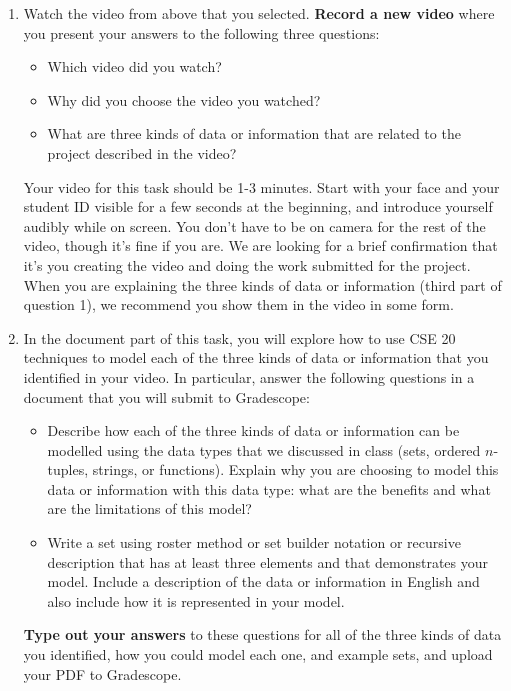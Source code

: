 \documentclass[12pt, oneside]{article}
\begin{document}
\begin{enumerate}
\item Watch the video from above that you selected. {\bf Record a new video} where you present 
your answers to the following three questions:
\begin{itemize}
    \item Which video did you watch?
    \item Why did you choose the video you watched?
    \item What are three kinds of data or information that are related to the project described in the video?
\end{itemize}
Your video for this task should be 1-3 minutes. Start with 
your face and your student ID visible for a few seconds at the beginning, and introduce yourself audibly while on screen. 
You don't have to be on camera for the rest of the video, though it's fine if you are. 
We are looking for a brief confirmation that it's you creating the video and doing the work 
submitted for the project. When you are explaining the three kinds of data or information (third part of question 1), 
we recommend you show them in the video in some form.

\item In the document part of this task, you will explore how to use CSE 20 techniques to 
model each of the three kinds of data or 
information that you identified in 
your video. In particular, answer the following questions in a document 
that you will submit to Gradescope:
\begin{itemize}
    \item Describe how each of the three kinds of data or information 
    can be modelled using the data types that we discussed in class (sets, ordered $n$-tuples, 
    strings, or functions). Explain why you are choosing to model this data or information with this data type: what are the benefits 
    and what are the limitations of this model?
    \item Write a set using roster method or set builder notation or recursive description that has at least three elements
    and that demonstrates
    your model. Include a description of the data or information in English and also include how it is represented 
    in your model.
\end{itemize}
{\bf Type out your answers} to these questions for all of the three kinds of data you identified, 
how you could model each one, and example sets, and upload your PDF 
to Gradescope.
\end{enumerate}
\end{document}
